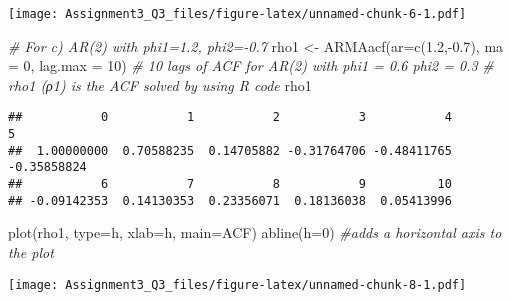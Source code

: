 \documentclass[
]{article}
\newenvironment{Shaded}{\begin{snugshade}}{\end{snugshade}}
\newcommand{\AttributeTok}[1]{\textcolor[rgb]{0.77,0.63,0.00}{#1}}
\newcommand{\CommentTok}[1]{\textcolor[rgb]{0.56,0.35,0.01}{\textit{#1}}}
\newcommand{\DecValTok}[1]{\textcolor[rgb]{0.00,0.00,0.81}{#1}}
\newcommand{\FloatTok}[1]{\textcolor[rgb]{0.00,0.00,0.81}{#1}}
\newcommand{\FunctionTok}[1]{\textcolor[rgb]{0.00,0.00,0.00}{#1}}
\newcommand{\NormalTok}[1]{#1}
\newcommand{\OtherTok}[1]{\textcolor[rgb]{0.56,0.35,0.01}{#1}}
\newcommand{\SpecialCharTok}[1]{\textcolor[rgb]{0.00,0.00,0.00}{#1}}
\newcommand{\StringTok}[1]{\textcolor[rgb]{0.31,0.60,0.02}{#1}}
\begin{document}
\texttt{[image: Assignment3\_Q3\_files/figure-latex/unnamed-chunk-6-1.pdf]}

\begin{Shaded}
\begin{Highlighting}[]
\CommentTok{\# For c) AR(2) with phi1=1.2, phi2={-}0.7}
\NormalTok{rho1 }\OtherTok{\textless{}{-}} \FunctionTok{ARMAacf}\NormalTok{(}\AttributeTok{ar=}\FunctionTok{c}\NormalTok{(}\FloatTok{1.2}\NormalTok{,}\SpecialCharTok{{-}}\FloatTok{0.7}\NormalTok{), }\AttributeTok{ma =} \DecValTok{0}\NormalTok{, }\AttributeTok{lag.max =} \DecValTok{10}\NormalTok{) }\CommentTok{\# 10 lags of ACF for AR(2) with phi1 = 0.6 phi2 = 0.3}
\CommentTok{\# rho1 (ρ1) is the ACF solved by using R code}
\NormalTok{rho1}
\end{Highlighting}
\end{Shaded}

\begin{verbatim}
##           0           1           2           3           4           5 
##  1.00000000  0.70588235  0.14705882 -0.31764706 -0.48411765 -0.35858824 
##           6           7           8           9          10 
## -0.09142353  0.14130353  0.23356071  0.18136038  0.05413996
\end{verbatim}

\begin{Shaded}
\begin{Highlighting}[]
\FunctionTok{plot}\NormalTok{(rho1, }\AttributeTok{type=}\StringTok{\textquotesingle{}h\textquotesingle{}}\NormalTok{, }\AttributeTok{xlab=}\StringTok{\textquotesingle{}h\textquotesingle{}}\NormalTok{, }\AttributeTok{main=}\StringTok{\textquotesingle{}ACF\textquotesingle{}}\NormalTok{)}
\FunctionTok{abline}\NormalTok{(}\AttributeTok{h=}\DecValTok{0}\NormalTok{)  }\CommentTok{\#adds a horizontal axis to the plot}
\end{Highlighting}
\end{Shaded}

\texttt{[image: Assignment3\_Q3\_files/figure-latex/unnamed-chunk-8-1.pdf]}
\end{document}
